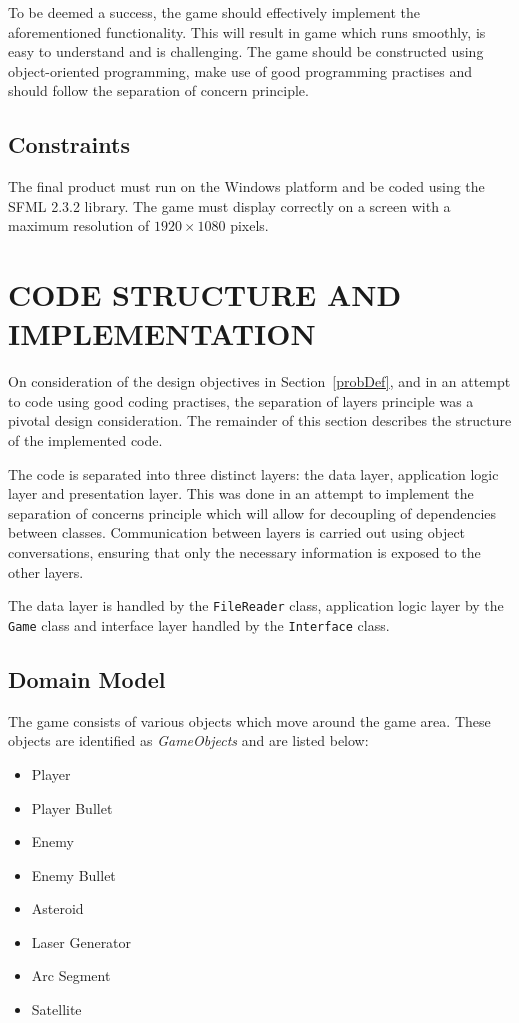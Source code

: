 \documentclass[10pt,twocolumn]{witseiepaper}
\begin{document}
To be deemed a success, the game should effectively implement the aforementioned functionality. This will result in game which runs smoothly, is easy to understand and is challenging. The game should be constructed using object-oriented programming, make use of good programming practises and should follow the separation of concern principle. 

\subsection{Constraints}

The final product must run on the Windows platform and be coded using the SFML 2.3.2 library. The game must display correctly on a screen with a maximum resolution of $1920 \times 1080$ pixels.

\section{CODE STRUCTURE AND IMPLEMENTATION}

On consideration of the design objectives in Section~\ref{probDef}, and in an attempt to code using good coding practises, the separation of layers principle was a pivotal design consideration. The remainder of this section describes the structure of the implemented code.

The code is separated into three distinct layers: the data layer, application logic layer and presentation layer. This was done in an attempt to implement the separation of concerns principle which will allow for decoupling of dependencies between classes. Communication between layers is carried out using object conversations, ensuring that only the necessary information is exposed to the other layers.

The data layer is handled by the \texttt{FileReader} class, application logic layer by the \texttt{Game} class and interface layer handled by the \texttt{Interface} class.

\subsection{Domain Model}

The game consists of various objects which move around the game area. These objects are identified as \textit{GameObjects} and are listed below:
\begin{itemize}
	\item Player
	\item Player Bullet
	\item Enemy
	\item Enemy Bullet
	\item Asteroid
	\item Laser Generator
	\item Arc Segment
	\item Satellite
\end{itemize}
\end{document}
